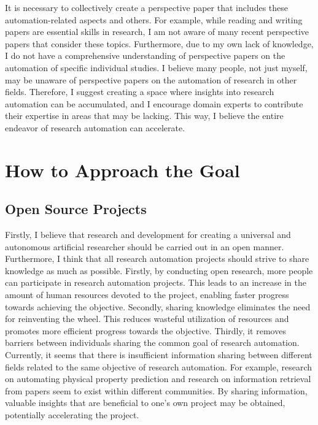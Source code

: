 \documentclass{book}
\begin{document}
It is necessary to collectively create a perspective paper that includes these automation-related aspects and others. For example, while reading and writing papers are essential skills in research, I am not aware of many recent perspective papers that consider these topics. Furthermore, due to my own lack of knowledge, I do not have a comprehensive understanding of perspective papers on the automation of specific individual studies. I believe many people, not just myself, may be unaware of perspective papers on the automation of research in other fields. Therefore, I suggest creating a space where insights into research automation can be accumulated, and I encourage domain experts to contribute their expertise in areas that may be lacking. This way, I believe the entire endeavor of research automation can accelerate.

\section{How to Approach the Goal}

\subsection{Open Source Projects}

Firstly, I believe that research and development for creating a universal and autonomous artificial researcher should be carried out in an open manner. Furthermore, I think that all research automation projects should strive to share knowledge as much as possible. Firstly, by conducting open research, more people can participate in research automation projects. This leads to an increase in the amount of human resources devoted to the project, enabling faster progress towards achieving the objective. Secondly, sharing knowledge eliminates the need for reinventing the wheel. This reduces wasteful utilization of resources and promotes more efficient progress towards the objective. Thirdly, it removes barriers between individuals sharing the common goal of research automation. Currently, it seems that there is insufficient information sharing between different fields related to the same objective of research automation. For example, research on automating physical property prediction and research on information retrieval from papers seem to exist within different communities. By sharing information, valuable insights that are beneficial to one's own project may be obtained, potentially accelerating the project.
\end{document}

